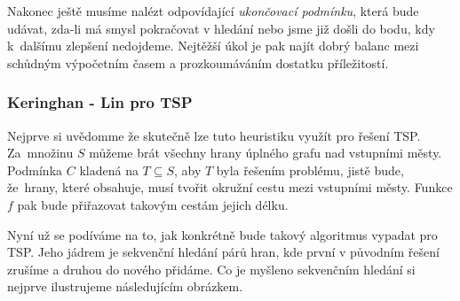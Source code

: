 \documentclass[
  biblatex,
  figures=false,
  glossaries,
  index
]{kidiplom}
\begin{document}
Nakonec ještě musíme nalézt odpovídající \textit{ukončovací podmínku}, která bude udávat, zda-li má smysl pokračovat v hledání nebo jsme již došli do bodu, kdy k~dalšímu zlepšení nedojdeme. Nejtěžší úkol je pak najít dobrý balanc mezi schůdným výpočetním časem a prozkoumáváním dostatku příležitostí.

\subsubsection{Keringhan - Lin pro TSP}
Nejprve si uvědomme že skutečně lze tuto heuristiku využít pro řešení TSP. Za~množinu $S$ můžeme brát všechny hrany úplného grafu nad vstupními městy. Podmínka $C$ kladená na $T \subseteq S$, aby $T$ byla řešením problému, jistě bude, že~hrany, které obsahuje, musí tvořit okružní cestu mezi vstupními městy. Funkce $f$ pak bude přiřazovat takovým cestám jejich délku.

Nyní už se podíváme na to, jak konkrétně bude takový algoritmus vypadat pro TSP. Jeho jádrem je sekvenční hledání párů hran, kde první v původním řešení zrušíme a druhou do nového přidáme. Co je myšleno sekvenčním hledání si nejprve ilustrujeme následujícím obrázkem.
\end{document}
